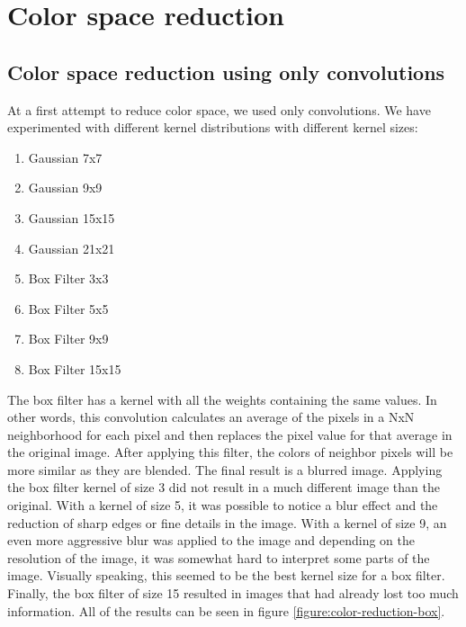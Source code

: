 \documentclass[]{IEEEtran}
\begin{document}
  \section{Color space reduction}

  \subsection{Color space reduction using only convolutions}
  At a first attempt to reduce color space, we used only convolutions. We have experimented with different kernel distributions with different kernel sizes:
  \begin{enumerate}
      \item Gaussian 7x7
      \item Gaussian 9x9
      \item Gaussian 15x15
      \item Gaussian 21x21
      \item Box Filter 3x3
      \item Box Filter 5x5
      \item Box Filter 9x9
      \item Box Filter 15x15
  \end{enumerate}

  The box filter has a kernel with all the weights containing the same values.
  In other words, this convolution calculates an average of the pixels in a NxN neighborhood for each pixel and then replaces
  the pixel value for that average in the original image. After applying this filter, the colors of neighbor pixels
  will be more similar as they are blended. The final result is a blurred image. Applying the box filter kernel of size 3 did not result
  in a much different image than the original. With a kernel of size 5, it was possible to notice a blur effect and the reduction of
  sharp edges or fine details in the image. With a kernel of size 9, an even more aggressive blur was applied to the image and
  depending on the resolution of the image, it was somewhat hard to interpret some parts of the image. Visually speaking, this seemed
  to be the best kernel size for a box filter. Finally, the box filter of size 15 resulted in images that
  had already lost too much information. All of the results can be seen in figure \ref{figure:color-reduction-box}.
\end{document}

